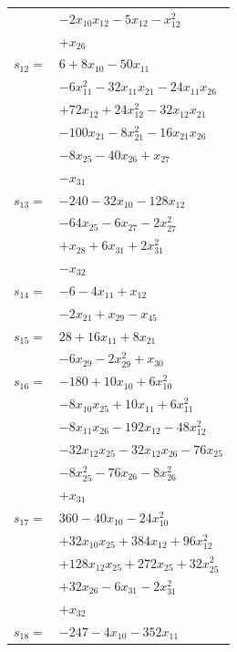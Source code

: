 \begin{longtable}{@{}r@{\;}l@{}}
 & \(\displaystyle -2x_{10}x_{12} -5x_{12} -x_{12}^{2}\) \\
 & \(\displaystyle +x_{26}\) \\[3pt]
\(s_{12}=\) & \(\displaystyle 6 +8x_{10} -50x_{11}\) \\
 & \(\displaystyle -6x_{11}^{2} -32x_{11}x_{21} -24x_{11}x_{26}\) \\
 & \(\displaystyle +72x_{12} +24x_{12}^{2} -32x_{12}x_{21}\) \\
 & \(\displaystyle -100x_{21} -8x_{21}^{2} -16x_{21}x_{26}\) \\
 & \(\displaystyle -8x_{25} -40x_{26} +x_{27}\) \\
 & \(\displaystyle -x_{31}\) \\[3pt]
\(s_{13}=\) & \(\displaystyle -240 -32x_{10} -128x_{12}\) \\
 & \(\displaystyle -64x_{25} -6x_{27} -2x_{27}^{2}\) \\
 & \(\displaystyle +x_{28} +6x_{31} +2x_{31}^{2}\) \\
 & \(\displaystyle -x_{32}\) \\[3pt]
\(s_{14}=\) & \(\displaystyle -6 -4x_{11} +x_{12}\) \\
 & \(\displaystyle -2x_{21} +x_{29} -x_{45}\) \\[3pt]
\(s_{15}=\) & \(\displaystyle 28 +16x_{11} +8x_{21}\) \\
 & \(\displaystyle -6x_{29} -2x_{29}^{2} +x_{30}\) \\[3pt]
\(s_{16}=\) & \(\displaystyle -180 +10x_{10} +6x_{10}^{2}\) \\
 & \(\displaystyle -8x_{10}x_{25} +10x_{11} +6x_{11}^{2}\) \\
 & \(\displaystyle -8x_{11}x_{26} -192x_{12} -48x_{12}^{2}\) \\
 & \(\displaystyle -32x_{12}x_{25} -32x_{12}x_{26} -76x_{25}\) \\
 & \(\displaystyle -8x_{25}^{2} -76x_{26} -8x_{26}^{2}\) \\
 & \(\displaystyle +x_{31}\) \\[3pt]
\(s_{17}=\) & \(\displaystyle 360 -40x_{10} -24x_{10}^{2}\) \\
 & \(\displaystyle +32x_{10}x_{25} +384x_{12} +96x_{12}^{2}\) \\
 & \(\displaystyle +128x_{12}x_{25} +272x_{25} +32x_{25}^{2}\) \\
 & \(\displaystyle +32x_{26} -6x_{31} -2x_{31}^{2}\) \\
 & \(\displaystyle +x_{32}\) \\[3pt]
\(s_{18}=\) & \(\displaystyle -247 -4x_{10} -352x_{11}\) \\

\end{longtable}
